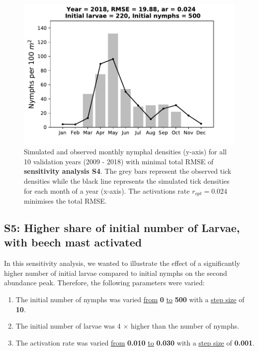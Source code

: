 \documentclass[a4paper, 11pt]{scrartcl}
\begin{document}
\begin{figure}[h!]
\begin{minipage}[c]{0.40\linewidth}
\end{minipage}
\begin{minipage}[c]{0.40\linewidth}
\includegraphics[width=\linewidth]{figures/s4/S4_2018}
\end{minipage}
\caption{Simulated and observed monthly nymphal densities (y-axis) for all 10 validation years (2009 - 2018) with minimal total RMSE of \textbf{sensitivity analysis S4}. The grey bars represent the observed tick densities while the black line represents the simulated tick densities for each month of a year (x-axis). The activations rate $r_{opt}= 0.024$ minimises the total RMSE.}
\label{fig:independent_initial_ticks_without_beech}
\end{figure}

\newpage
\subsection{S5: Higher share of initial number of Larvae, with beech mast activated}
In this sensitivity analysis, we wanted to illustrate the effect of a significantly higher number of initial larvae compared to initial nymphs on the second abundance peak. Therefore, the following parameters were varied:

\begin{enumerate}
\item The initial number of nymphs was varied \underline{from} \textbf{0} \underline{to} \textbf{500} with a \underline{step size} of \textbf{10}.
\item The initial number of larvae was 4 $\times$ higher than the number of nymphs.
\item The activation rate was varied \underline{from} \textbf{0.010} \underline{to} \textbf{0.030} with a \underline{step size} of \textbf{0.001}.
\end{enumerate}
\end{document}
